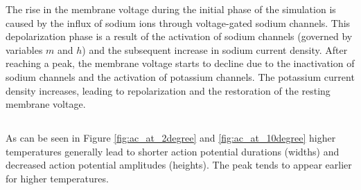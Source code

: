 \documentclass{article}
\begin{document}
    The rise in the membrane voltage during the initial phase of the simulation is caused by the influx of sodium ions through voltage-gated sodium channels.
    This depolarization phase is a result of the activation of sodium channels (governed by variables $m$ and $h$) and the subsequent increase in sodium current density.
    After reaching a peak, the membrane voltage starts to decline due to the inactivation of sodium channels and the activation of potassium channels.
    The potassium current density increases, leading to repolarization and the restoration of the resting membrane voltage.

    \subsection{}
    As can be seen in Figure \ref{fig:ac_at_2degree} and \ref{fig:ac_at_10degree} higher temperatures generally lead to shorter action potential durations (widths) and decreased action potential amplitudes (heights).
    The peak tends to appear earlier for higher temperatures.
\end{document}
